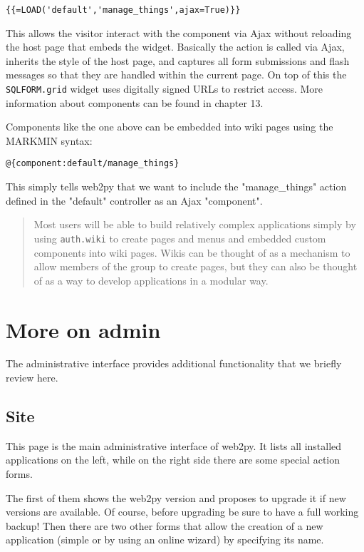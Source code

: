 \documentclass[justified,sixbynine,notoc]{tufte-book}
\def\ft{\small\tt}
\def\inxx#1{\index{#1}}
\begin{document}
\begin{fullwidth}
\begin{lstlisting}[keywords={}]
{{=LOAD('default','manage_things',ajax=True)}}
\end{lstlisting}

This allows the visitor interact with the component via Ajax without reloading the host page that embeds the widget. Basically the action is called via Ajax, inherits the style of the host page, and captures all form submissions and flash messages so that they are handled within the current page. On top of this the {\ft SQLFORM.grid} widget uses digitally signed URLs to restrict access. More information about components can be found in chapter 13.

Components like the one above can be embedded into wiki pages using the MARKMIN syntax:

\begin{lstlisting}
@{component:default/manage_things}
\end{lstlisting}

This simply tells web2py that we want to include the "manage\_things" action defined in the "default" controller as an Ajax "component".

\begin{quote}Most users will be able to build relatively complex applications simply by using {\ft auth.wiki} to create pages and menus and embedded custom components into wiki pages. Wikis can be thought of as a mechanism to allow members of the group to create pages, but they can also be thought of as a way to develop applications in a modular way.\end{quote}
\goodbreak\section{More on {\bf admin}}

\inxx{admin}

The administrative interface provides additional functionality that we briefly review here.

\goodbreak\subsection{Site}

\inxx{site}

This page is the main administrative interface of web2py. It lists all installed applications on the left, while on the right side there are some special action forms.

The first of them shows the web2py version and proposes to upgrade it if new versions are available. Of course, before upgrading be sure to have a full working backup!
Then there are two other forms that allow the creation of a new application (simple or by using an online wizard) by specifying its name.


\end{fullwidth}
\end{document}
